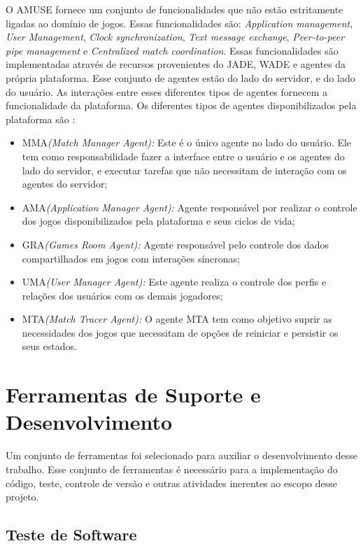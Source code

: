 O AMUSE fornece um conjunto de funcionalidades que não estão estritamente ligadas ao domínio de jogos. Essas funcionalidades são: \textit{Application management}, \textit{User Management}, \textit{Clock synchronization}, \textit{Text message exchange}, \textit{Peer-to-peer pipe management} e \textit{Centralized match coordination}. Essas funcionalidades são implementadas através de recursos provenientes do JADE, WADE e agentes da própria plataforma. Esse conjunto de agentes estão do lado do servidor, e do lado do usuário. As interações entre esses diferentes tipos de agentes fornecem a funcionalidade da plataforma. Os diferentes tipos de agentes disponibilizados pela plataforma são \cite{bergenti2015}:

\begin{itemize}
  \item MMA\textit{(Match Manager Agent):} Este é o único agente no lado do usuário. Ele tem como responsabilidade fazer a interface entre o usuário e os agentes do lado do servidor, e executar tarefas que não necessitam de interação com os agentes do servidor;
  \item AMA\textit{(Application Manager Agent):} Agente responsável por realizar o controle dos jogos disponibilizados pela plataforma e seus ciclos de vida;
  \item GRA\textit{(Games Room Agent):} Agente responsável pelo controle dos dados compartilhados em jogos com interações síncronas;
  \item UMA\textit{(User Manager Agent):} Este agente realiza o controle dos perfis e relações dos usuários com os demais jogadores;
  \item MTA\textit{(Match Tracer Agent):} O agente MTA tem como objetivo suprir as necessidades dos jogos que necessitam de opções de reiniciar e persistir os seus estados.
\end{itemize}


\section{Ferramentas de Suporte e Desenvolvimento}

Um conjunto de ferramentas foi selecionado para auxiliar o desenvolvimento desse trabalho. Esse conjunto de ferramentas é necessário para a implementação do código, teste, controle de versão e outras atividades inerentes ao escopo desse projeto.

    \subsection{Teste de Software}

